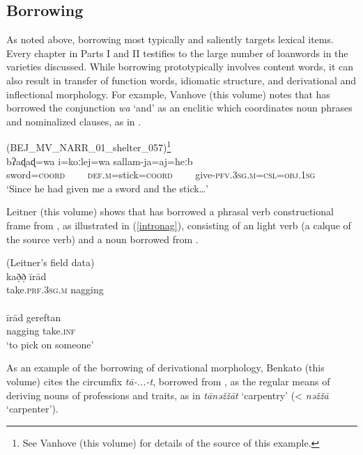 \documentclass[output=paper]{langsci/langscibook}
\begin{document}
\subsection{Borrowing}

As noted above, borrowing most typically and saliently targets lexical items. Every chapter in Parts I and II testifies to the large number of {loanwords} in the varieties discussed. While borrowing prototypically involves content words, it can also result in {transfer} of function words, {idiomatic} structure, and {derivational} and {inflectional} morphology. For example, Vanhove (this volume) notes that  has borrowed the  conjunction \textit{wa} `and' as an enclitic which coordinates noun phrases and nominalized clauses, as in .

\ea \label{introsword}
{ (BEJ\_MV\_NARR\_01\_shelter\_057)\footnote{See Vanhove (this volume) for details of the source of this example.}}\\
\gll bʔaɖaɖ=wa i=koːlej=wa sallam-ja=aj=heːb\\
     sword=\textsc{coord}~~~~ \textsc{def.m}=stick=\textsc{coord}~~~~ give-\textsc{pfv.3sg.m=csl=obj.1sg}\\
\glt `Since he had given me a sword and the stick…'
\z


Leitner (this volume) shows that   has borrowed a phrasal verb constructional frame from , as illustrated in (\ref{intronag}), consisting of an  {light verb} (a {calque} of the  source verb) and a noun borrowed from .


\ea \label{intronag}
\ea {}  (Leitner's field data)\\
\gll kað̣ð̣ īrād\\
     take.\textsc{prf}.3\textsc{sg}.\textsc{m} nagging\\
\\
\gll īrād gereftan\\
     nagging take.\textsc{inf}\\
\glt ‘to pick on someone’
\z
\z


As an example of the borrowing of {derivational} morphology, Benkato (this volume) cites the   circumfix \textit{tā-...-t}, borrowed from , as the regular means of deriving nouns of professions and traits, as in \textit{tānǝžžā{\R}t} ‘carpentry’ (< \textit{nǝžžā\R} `carpenter').
\end{document}
